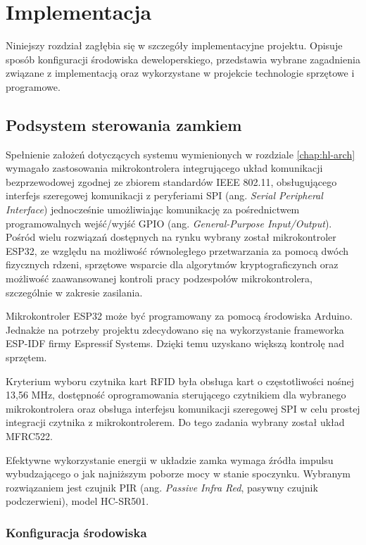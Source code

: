 \chapter{Implementacja}
\label{chap:implementation}

    Niniejszy rozdział zagłębia się w szczegóły implementacyjne projektu. Opisuje sposób konfiguracji środowiska deweloperskiego, przedstawia wybrane zagadnienia związane z implementacją oraz wykorzystane w projekcie technologie sprzętowe i programowe.

    \section{Podsystem sterowania zamkiem}

        Spełnienie założeń dotyczących systemu wymienionych w rozdziale \ref{chap:hl-arch} wymagało zastosowania mikrokontrolera integrującego układ komunikacji bezprzewodowej zgodnej ze zbiorem standardów IEEE 802.11, obsługującego interfejs szeregowej komunikacji z peryferiami SPI (ang. \textit{Serial Peripheral Interface}) jednocześnie umożliwiając komunikację za pośrednictwem programowalnych wejść/wyjść GPIO (ang. \textit{General-Purpose Input/Output}). Pośród wielu rozwiązań dostępnych na rynku wybrany został mikrokontroler ESP32, ze względu na możliwość równoległego przetwarzania za pomocą dwóch fizycznych rdzeni, sprzętowe wsparcie dla algorytmów kryptograficzynch oraz możliwość zaawansowanej kontroli pracy podzespołów mikrokontrolera, szczególnie w zakresie zasilania.

        Mikrokontroler ESP32 może być programowany za pomocą środowiska Arduino. Jednakże na potrzeby projektu zdecydowano się na wykorzystanie frameworka ESP-IDF firmy Espressif Systems. Dzięki temu uzyskano większą kontrolę nad sprzętem.

        Kryterium wyboru czytnika kart RFID była obsługa kart o częstotliwości nośnej 13,56 MHz, dostępność oprogramowania sterującego czytnikiem dla wybranego mikrokontrolera oraz obsługa interfejsu komunikacji szeregowej SPI w celu prostej integracji czytnika z mikrokontrolerem. Do tego zadania wybrany został układ MFRC522.

        Efektywne wykorzystanie energii w układzie zamka wymaga źródła impulsu wybudzającego o jak najniższym poborze mocy w stanie spoczynku. Wybranym rozwiązaniem jest czujnik PIR (ang. \textit{Passive Infra Red}, pasywny czujnik podczerwieni), model HC-SR501.

        \subsection{Konfiguracja środowiska}
            

